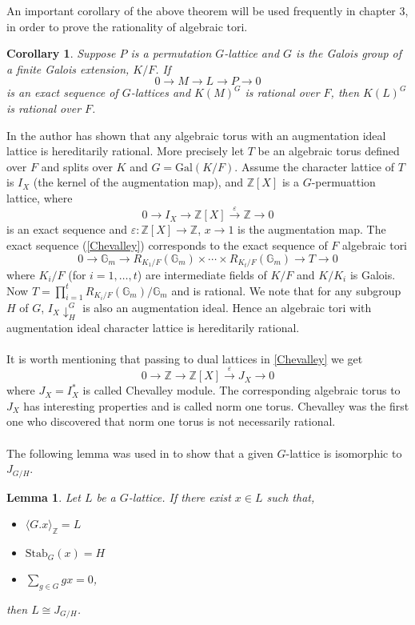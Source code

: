 \documentclass{article}
\theoremstyle{plain}
\newtheorem{lemma}[theorem]{Lemma}
\newtheorem{corollary}[theorem]{Corollary}
\theoremstyle{definition}
\newcommand{\Z}{\ensuremath{\mathbb{Z}}}
\begin{document}
\noindent
An important corollary of the above theorem will be used frequently in chapter 3, in order to prove the rationality of algebraic tori.
\begin{corollary}\label{permcoker}
Suppose $P$ is a permutation $G$-lattice and $G$ is the Galois group of a finite Galois extension, $K/F$.  If $$0 \longrightarrow M \longrightarrow L \longrightarrow P \longrightarrow 0 $$ is an exact sequence of $G$-lattices and $K(M)^G$ is rational over $F$, then $K(L)^G$ is rational over $F$.
\end{corollary}
\noindent
In \cite[Section 2.4.8]{Voskresenskii} the author has shown that any algebraic torus with an augmentation ideal lattice is hereditarily rational. More precisely let $T$ be an algebraic torus defined over $F$ and splits over $K$ and $G = \mathrm{Gal}(K/F)$. Assume the character lattice of $T$ is $I_X$ (the kernel of the augmentation map), and $\Z [X]$ is a $G$-permuattion lattice, where 
\begin{equation}\label{Chevalley}
0 \longrightarrow I_X \longrightarrow \Z [X] \overset{\varepsilon} \longrightarrow  \Z \longrightarrow 0
\end{equation}
is an exact sequence and $\varepsilon : \Z [X]  \rightarrow \Z $, $x \rightarrow 1$ is the augmentation map. The exact sequence (\ref{Chevalley}) corresponds to the exact sequence of $F$ algebraic tori
$$0 \longrightarrow \mathbb{G}_m \longrightarrow R_{K_1/F}(\mathbb{G}_m) \times \cdots \times R_{K_t/F}(\mathbb{G}_m) \longrightarrow  T \longrightarrow 0$$
where $K_i/F$ (for $i = 1, \ldots ,t $) are intermediate fields of $K/F$ and $K/K_i$ is Galois. Now $T = \prod^t_{i = 1}R_{K_i/F}(\mathbb{G}_m)/\mathbb{G}_m$ and is rational. We note that for any subgroup $H$ of $G$, ${I_X}\downarrow^G_H$ is also an augmentation ideal. Hence an algebraic tori with augmentation ideal character lattice is hereditarily rational.\\
\\
It is worth mentioning that passing to dual lattices in \ref{Chevalley} we get 
$$0 \longrightarrow \Z \longrightarrow \Z [X] \overset{\varepsilon} \longrightarrow  J_{X} \longrightarrow 0$$
where $J_{X}= I^{\ast}_X$ is called Chevalley module. The corresponding algebraic torus to $J_X$ has interesting properties and is called norm one torus. Chevalley was the first one who discovered that norm one torus is not necessarily rational. \\
\\
The following lemma was used in \cite{Nicole1} to show that a given $G$-lattice is isomorphic to $J_{G/H}$.
\begin{lemma}\cite[Remark 4.1]{Nicole1}
Let $L$ be a $G$-lattice. If there exist $x\in L$ such that,
\begin{itemize}
\item $\langle G.x \rangle_{\Z} = L$
\item $\mathrm{Stab}_G(x) = H$
\item $\sum_{g \in G}gx = 0$,
\end{itemize}
then $L \cong J_{G/H}$.
\end{lemma}
\end{document}

